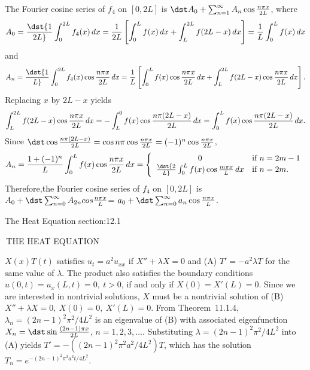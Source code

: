 \documentclass[dvips]{book}
\renewcommand{\exer}[1]{\par\medskip\;\noindent{\color{red}\bf #1.}}
\numberwithin{example}{section}
\numberwithin{equation}{section}
\numberwithin{theorem}{section}
\numberwithin{table}{section}
\numberwithin{figure}{section}
\begin{document}
\exer{11.3.60}
The Fourier cosine series of $f_4$ on $[0,2L]$ is $\dst
A_0+\sum_{n=1}^\infty A_n\cos{n\pi x\over2L}$, where
$$
A_0=\dst{1\over2L}\int_0^{2L}f_4(x)\,dx
={1\over2L}\left[\int_0^Lf(x)\,dx+\int_L^{2L}f(2L-x)\,dx\right]
={1\over L}\int_0^L f(x)\,dx
$$
 and
$$
A_n=\dst{1\over L}\int_0^{2L}f_4(x)\cos{n\pi x\over2L}\,dx
={1\over
L}\left[\int_0^Lf(x)\cos{n\pi x\over2L}\,dx+\int_L^{2L}f(2L-x)
\cos{n\pi x\over2L}\,dx\right].
$$
Replacing $x$ by $2L-x$   yields
$$
\int_L^{2L}f(2L-x)\cos{n\pi x\over2L}\,dx=-\int_L^0f(x)
\cos{n\pi(2L-x)\over2L}\,dx
=\int_0^Lf(x)\cos{n\pi(2L-x)\over2L}\,dx.
$$
Since
$\dst\cos{n\pi(2L-x)\over2L}=\cos n\pi\cos{n\pi x\over2L}=(-1)^n
\cos{n\pi x\over2L}$,
$$
A_n={1+(-1)^n\over L}\int_0^Lf(x)\cos{n\pi x\over2L}\,dx
=\left\{\begin{array}{cl}
0&\mbox{if $n=2m-1$}\\
\dst{2\over L}\int_0^Lf(x)\cos{m\pi x\over L}\,dx&\mbox{if
$n=2m$}.
\end{array}\right.
$$
Therefore,the Fourier cosine series of $f_4$ on $[0,2L]$
is $A_0+\dst\sum_{n=0}^\infty A_{2n}cos{n\pi x\over L}$=
$a_0+\dst\sum_{n=0}^\infty a_n\cos{n\pi x\over L}$.


\newpage
\thispagestyle{empty}
\setcounter{chapter}{12}


{The Heat Equation}
 {section:12.1}

\renewcommand{\thissection}{\sectiontitle
{\,\quad THE HEAT EQUATION}}
\thissection


\vspace*{-17.5pt}

\exer{12.1.2}
 $X(x)T(t)$  satisfies
$u_t=a^2u_{xx}$ if $X''+\lambda X=0$ and (A) $T'=-a^2\lambda T$
 for the same value of $\lambda$.  The product also
satisfies  the
 boundary conditions $u(0,t)= u_x(L,t)=0, \ t>0$,  if and
only if
$X(0)=
X'(L)=0$.
Since we are interested in nontrivial solutions, $X$ must be a
nontrivial solution of
(B) $X''+\lambda X=0,\ X(0)=0,\ X'(L)=0$.
 From Theorem~11.1.4,
$\lambda_n=(2n-1)^2\pi^2/4L^2$ is an eigenvalue of (B) with
associated eigenfunction $X_n=\dst\sin{(2n-1)\pi x\over2L}$,
$n=1,2,3,\dots$. Substituting $\lambda=(2n-1)^2\pi^2/4L^2$  into
(A) yields
$T'=-((2n-1)^2\pi^2a^2/4L^2)T$,
which has the solution $T_n=e^{-(2n-1)^2\pi^2a^2t/4L^2}$.
\end{document}
